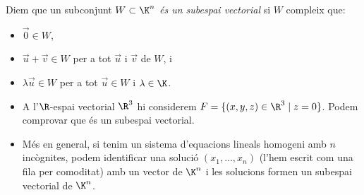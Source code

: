 \begin{definicio}\label{def:subespai}
	Diem que un subconjunt \emph{$W\subset \K^n$ és un subespai vectorial} si $W$ compleix que:
	\begin{itemize}
	    \item $\vec 0 \in W$,
		\item $\vec u+\vec v \in W$ per a tot $\vec u$ i $\vec v$ de $W$, i
		\item $\lambda \vec u\in W$ per a tot $\vec u\in W$ i $\lambda\in\K$.
	\end{itemize}
\end{definicio}
\begin{exemple}
	\begin{itemize}
		\item A l'$\R$-espai vectorial $\R^3$ hi considerem $F=\{(x,y,z) \in \R^3 \mid z=0\}$. Podem comprovar que és un subespai vectorial.
		\item Més en general, si tenim un sistema d'equacions lineals homogeni amb $n$ incògnites, podem identificar una solució $(x_1,\dots,x_n)$ (l'hem escrit com una fila per comoditat) amb un vector de $\K^n$ i les solucions formen un subespai vectorial de $\K^n$.
	\end{itemize}
\end{exemple}

